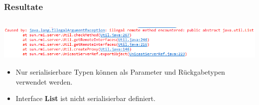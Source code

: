 
\begin{frame}
  \frametitle{Resultate}
	    \begin{column}{1\linewidth}		
			\begin{center}
	    		\includegraphics[width=1\textwidth]{images/Exception.png}
	    	\end{center}	
		\begin{itemize}
		\item Nur serialisierbare Typen können als Parameter und Rückgabetypen verwendet werden.
		\item Interface \textbf{List} ist nicht serialisierbar definiert.
		\end{itemize}
	    \end{column}
\end{frame}

